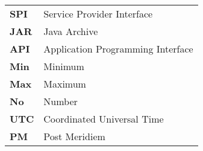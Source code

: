 \begin{tabularx}{\textwidth}{@{}lL{0.8\textwidth}@{}}
    \textbf{SPI}  & Service Provider Interface            \\
    \textbf{JAR}  & Java Archive                          \\
    \textbf{API}  & Application Programming Interface     \\

    \textbf{Min}  & Minimum                               \\
    \textbf{Max}  & Maximum                               \\
    \textbf{No}   & Number                                \\
    \textbf{UTC}  & Coordinated Universal Time            \\
    \textbf{PM}   & Post Meridiem                         \\
\end{tabularx}